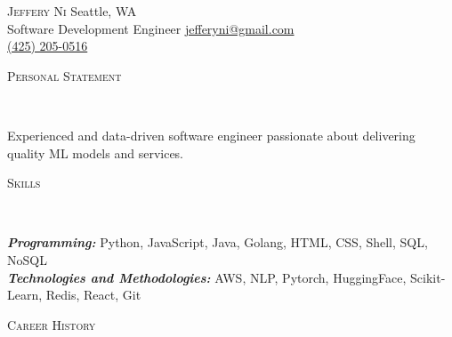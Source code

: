\documentclass[9pt]{article}
\newenvironment{changemargin}[2]{%
  \begin{list}{}{%
    \setlength{\topsep}{0pt}%
    \setlength{\leftmargin}{#1}%
    \setlength{\rightmargin}{#2}%
    \setlength{\listparindent}{\parindent}%
    \setlength{\itemindent}{\parindent}%
    \setlength{\parsep}{\parskip}%
  }%
  \item[]}{\end{list}
}
\newcommand{\lineover}{
	\begin{changemargin}{-0.05in}{-0.05in}
		\vspace*{-8pt}
		\hrulefill \\
		\vspace*{-2pt}
	\end{changemargin}
}
\newcommand{\header}[1]{
	\begin{changemargin}{-0.5in}{-0.5in}
		\scshape{#1}\\
  	\lineover
	\end{changemargin}
}
\newcommand{\contact}[5]{
	\begin{changemargin}{-0.25in}{0in}
		\begin{body}
			{\LARGE \scshape {#1}} \hfill
            {{#2}}\\
            {{#3}} \hfill
			{\url{#4}}\\ \hfill
            {\url{#5}} \smallskip
		\end{body}
	\end{changemargin}
}
\newenvironment{body} {
	\vspace*{-16pt}
	\begin{changemargin}{-0.25in}{-0.5in}
  }	
	{\end{changemargin}
}
\begin{document}
\contact{Jeffery Ni}{Seattle, WA}{Software Development Engineer}{jefferyni@gmail.com}{(425) 205-0516}


\header{Personal Statement}

\begin{body}
	\vspace{14pt}
	Experienced and data-driven software engineer passionate about delivering quality ML models and services.
\end{body}

\medskip


\header{Skills}

\begin{body}
	\vspace{14pt}
	\emph{\textbf{Programming:}}{} Python, JavaScript, Java, Golang, HTML, CSS, Shell, SQL, NoSQL\\
	\smallskip
	\emph{\textbf{Technologies and Methodologies:}}{} AWS, NLP, Pytorch, HuggingFace, Scikit-Learn, Redis, React, Git\\
\end{body}

\medskip


\header{Career History}
\end{document}

